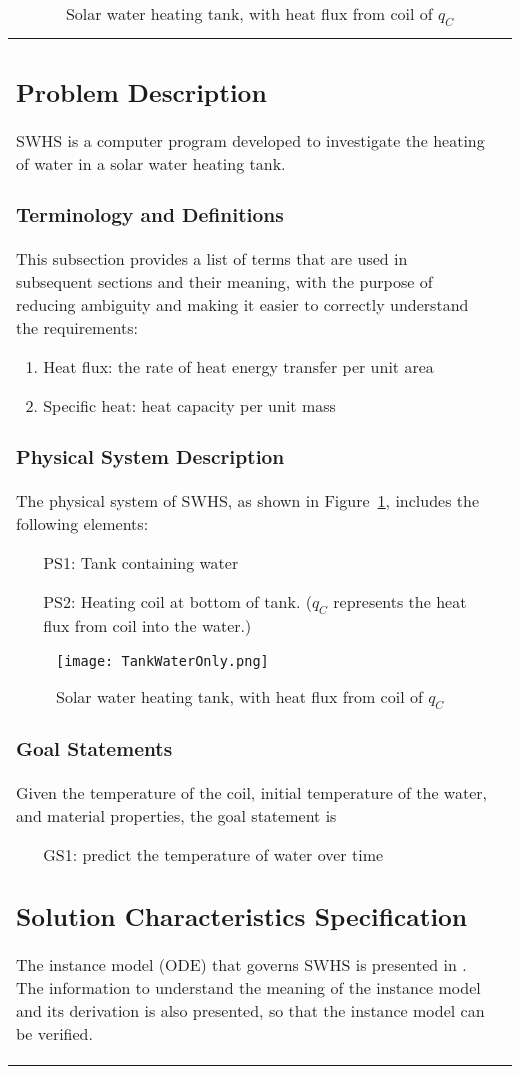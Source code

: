 \documentclass[12pt]{article}
\begin{document}
\begin{longtable}{l l}
\subsection{Problem Description}
\label{Sec:PD}
SWHS is a computer program developed to investigate the heating of water in a solar water heating tank.
\subsubsection{Terminology and Definitions}
\label{Sec:TaD}
This subsection provides a list of terms that are used in subsequent sections and their meaning, with the purpose of reducing ambiguity and making it easier to correctly understand the requirements:
\begin{enumerate}
\item{Heat flux: the rate of heat energy transfer per unit area}
\item{Specific heat: heat capacity per unit mass}
\end{enumerate}
\subsubsection{Physical System Description}
\label{Sec:PSD}
The physical system of SWHS, as shown in Figure~\ref{Figure:Swhtwhffco}, includes the following elements:
\begin{itemize}
\item[PS1:]Tank containing water
\item[PS2:]Heating coil at bottom of tank. ($q_{C}$ represents the heat flux from coil into the water.)
\end{itemize}
\begin{figure}
\begin{center}
\texttt{[image: TankWaterOnly.png]}
\caption{Solar water heating tank, with heat flux from coil of $q_{C}$}
\label{Figure:Swhtwhffco}
\end{center}
\end{figure}
\subsubsection{Goal Statements}
\label{Sec:GS}
Given the temperature of the coil, initial temperature of the water, and material properties, the goal statement is
\begin{itemize}
\item[GS1:]predict the temperature of water over time
\end{itemize}
\subsection{Solution Characteristics Specification}
\label{Sec:SCS}
The instance model (ODE) that governs SWHS is presented in . The information to understand the meaning of the instance model and its derivation is also presented, so that the instance model can be verified.

\end{longtable}
\end{document}

